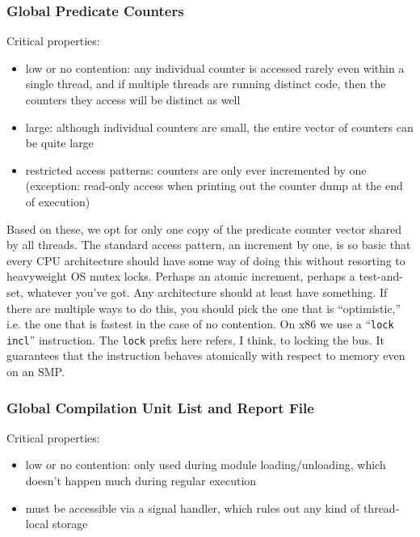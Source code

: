 \documentclass[10pt,twocolumn]{article}
\begin{document}
\subsubsection{Global Predicate Counters}

Critical properties:

\begin{itemize}
\item low or no contention: any individual counter is accessed rarely
  even within a single thread, and if multiple threads are running
  distinct code, then the counters they access will be distinct as
  well
\item large: although individual counters are small, the entire vector
  of counters can be quite large
\item restricted access patterns: counters are only ever incremented
  by one (exception: read-only access when printing out the counter
  dump at the end of execution)
\end{itemize}

Based on these, we opt for only one copy of the predicate counter
vector shared by all threads.  The standard access pattern, an
increment by one, is so basic that every CPU architecture should have
some way of doing this without resorting to heavyweight OS mutex
locks.  Perhaps an atomic increment, perhaps a test-and-set, whatever
you've got.  Any architecture should at least have something.  If
there are multiple ways to do this, you should pick the one that is
``optimistic,'' i.e. the one that is fastest in the case of no
contention.  On x86 we use a ``\texttt{lock incl}'' instruction.  The
\texttt{lock} prefix here refers, I think, to locking the bus.  It
guarantees that the instruction behaves atomically with respect to
memory even on an SMP.

\subsubsection{Global Compilation Unit List and Report File}

Critical properties:

\begin{itemize}
\item low or no contention: only used during module loading/unloading,
  which doesn't happen much during regular execution
\item must be accessible via a signal handler, which rules out any
  kind of thread-local storage
\end{itemize}
\end{document}

